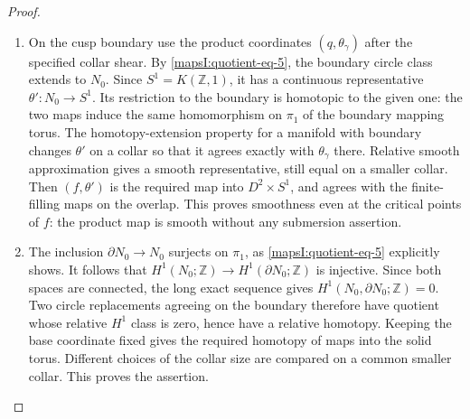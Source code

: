 \begin{proof}
\begin{enumerate}[label=\arabic*.,leftmargin=*]
\item On the cusp boundary use the product coordinates
$(q,\theta_\gamma)$ after the specified collar shear.
By \eqref{mapsI:quotient-eq-5}, the boundary circle class extends to $N_0$.
Since $S^1=K(\mathbb Z,1)$, it has a continuous representative
$\theta':N_0\to S^1$.  Its restriction to the boundary is
homotopic to the given one: the two maps induce the same
homomorphism on $\pi_1$ of the boundary mapping torus.
The homotopy-extension property for a manifold with boundary
changes $\theta'$ on a collar so that it agrees exactly with
$\theta_\gamma$ there.  Relative smooth approximation gives
a smooth representative, still equal on a smaller collar.
Then $(f,\theta')$ is the required map into $D^2\times S^1$,
and agrees with the finite-filling maps on the overlap.
This proves smoothness even at the critical points of $f$:
the product map is smooth without any submersion assertion.

\item The inclusion $\partial N_0\to N_0$ surjects on $\pi_1$,
as \eqref{mapsI:quotient-eq-5} explicitly shows.  It follows that
$H^1(N_0;\mathbb Z)\to H^1(\partial N_0;\mathbb Z)$
is injective.  Since both spaces are connected, the long
exact sequence gives $H^1(N_0,\partial N_0;\mathbb Z)=0$.
Two circle replacements agreeing on the boundary therefore
have quotient whose relative $H^1$ class is zero, hence
have a relative homotopy.  Keeping the base coordinate
fixed gives the required homotopy of maps into the solid
torus.  Different choices of the collar size are compared
on a common smaller collar.  This proves the assertion.
\end{enumerate}
\end{proof}



